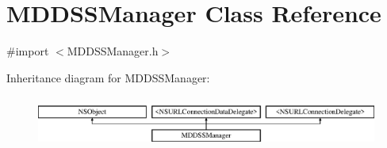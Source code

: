 \hypertarget{interface_m_d_d_s_s_manager}{\section{M\-D\-D\-S\-S\-Manager Class Reference}
\label{interface_m_d_d_s_s_manager}
}


{\ttfamily \#import $<$M\-D\-D\-S\-S\-Manager.\-h$>$}

Inheritance diagram for M\-D\-D\-S\-S\-Manager\-:\begin{figure}[H]
\begin{center}
\leavevmode
\includegraphics[height=1.744548cm]{interface_m_d_d_s_s_manager}
\end{center}
\end{figure}
